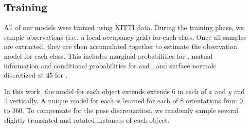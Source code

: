 \subsection{Training} \label{sec:training}

All of our models were trained using KITTI data. During the training phase, we
sample observations (i.e., a local occupancy grid) for each class. Once all samples are
extracted, they are then accumulated together to estimate the observation model
for each class. This includes marginal probabilities for
, mutual information and conditional probabilities for
 and , and surface normals discretized at
\unit{45}{\deg} for .

In this work, the model for each object extends extends \unit{6}{\m} in each of $x$ and $y$
and \unit{4}{\m} vertically. A unique model for each is learned for each of 8
orientations from \unit{0} to \unit{360}{\deg}. To compensate for the pose
discretization, we randomly sample several slightly translated and rotated
instances of each object.
